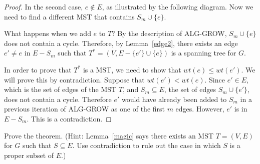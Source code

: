 \documentclass[12pt]{article}
\newcommand{\mfigure}[3]{\bigskip\centerline{\resizebox{#1}{#2}{\texttt{[image: \#3]}}}\bigskip}
\begin{document}
\begin{list}{\textbf{()}}
{\begin{proof}
In the second case, $e \notin E$, as illustrated by the following
diagram. Now we need to find a different MST that contains 
$S_m \cup \{e\}$.

\mfigure{!}{2in}{MSTproof}

What happens when we add $e$ to $T$? By the description of ALG-GROW,
$S_m \cup \{e\}$ does not contain a cycle. Therefore, by Lemma~\ref{edge2},
there exists an edge $e'\neq e$ in $E-S_m$ such that
$T^*=(V,E-\{e'\} \cup \{e\})$ is a spanning tree for $G$.

In order to prove that $T^*$ is a MST, we need to show that
$wt(e)\leq wt(e')$. We will prove this by contradiction. Suppose that
$wt(e')< wt(e)$. Since $e'\in E$, which is the set of edges of the MST
$T$, and $S_m \subseteq E$, the set of edges $S_m \cup \{e'\}$, does not
contain a cycle. Therefore $e'$ would have already been added to $S_m$
in a previous iteration of ALG-GROW as one of the first $m$
edges. However, $e'$ is in $E-S_m$. This is a contradiction.
\end{proof}
}

\item
Prove the theorem. (Hint: Lemma~\ref{magic} says there exists an MST $T=(V,E)$ for $G$ such that $S\subseteq E$. Use contradiction to rule out the case in which $S$ is a proper subset of $E$.)


\end{list}
\end{document}
